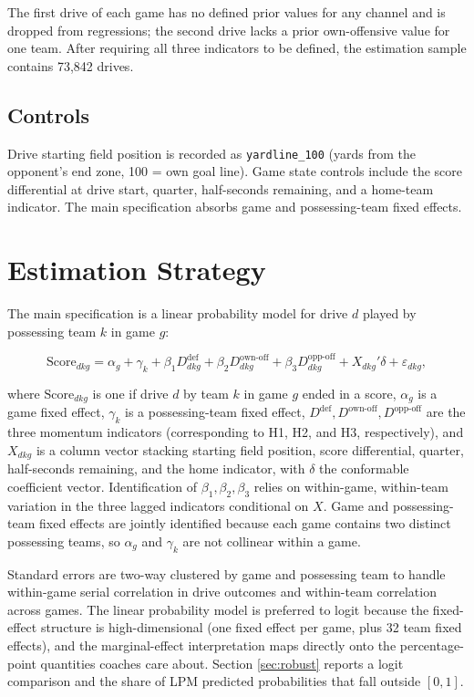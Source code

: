 \documentclass[11pt]{article}
\begin{document}
The first drive of each game has no defined prior values for any channel and
is dropped from regressions; the second drive lacks a prior own-offensive
value for one team. After requiring all three indicators to be defined, the
estimation sample contains 73{,}842 drives.

\subsection{Controls}

Drive starting field position is recorded as \texttt{yardline\_100} (yards
from the opponent's end zone, 100 = own goal line). Game state controls
include the score differential at drive start, quarter, half-seconds
remaining, and a home-team indicator. The main specification absorbs game
and possessing-team fixed effects.

\section{Estimation Strategy}\label{sec:strategy}

The main specification is a linear probability model for drive $d$ played
by possessing team $k$ in game $g$:

\begin{equation}\label{eq:main}
    \text{Score}_{dkg} = \alpha_g + \gamma_k + \beta_1 D_{dkg}^{\text{def}} +
    \beta_2 D_{dkg}^{\text{own-off}} + \beta_3 D_{dkg}^{\text{opp-off}} +
    X_{dkg}'\delta + \varepsilon_{dkg},
\end{equation}

where $\text{Score}_{dkg}$ is one if drive $d$ by team $k$ in game $g$ ended
in a score, $\alpha_g$ is a game fixed effect, $\gamma_k$ is a possessing-team
fixed effect, $D^{\text{def}}, D^{\text{own-off}}, D^{\text{opp-off}}$ are the
three momentum indicators (corresponding to H1, H2, and H3, respectively),
and $X_{dkg}$ is a column vector stacking starting field position, score
differential, quarter, half-seconds remaining, and the home indicator, with
$\delta$ the conformable coefficient vector. Identification of $\beta_1,
\beta_2, \beta_3$ relies on within-game, within-team variation in the three
lagged indicators conditional on $X$. Game and possessing-team fixed effects
are jointly identified because each game contains two distinct possessing
teams, so $\alpha_g$ and $\gamma_k$ are not collinear within a game.

Standard errors are two-way clustered by game and possessing team
\citep{cameron2011robust} to handle within-game serial correlation in drive
outcomes and within-team correlation across games. The linear probability
model is preferred to logit because the fixed-effect structure is
high-dimensional (one fixed effect per game, plus 32 team fixed effects), and
the marginal-effect interpretation maps directly onto the percentage-point
quantities coaches care about. Section \ref{sec:robust} reports a logit
comparison and the share of LPM predicted probabilities that fall outside
$[0,1]$.
\end{document}
